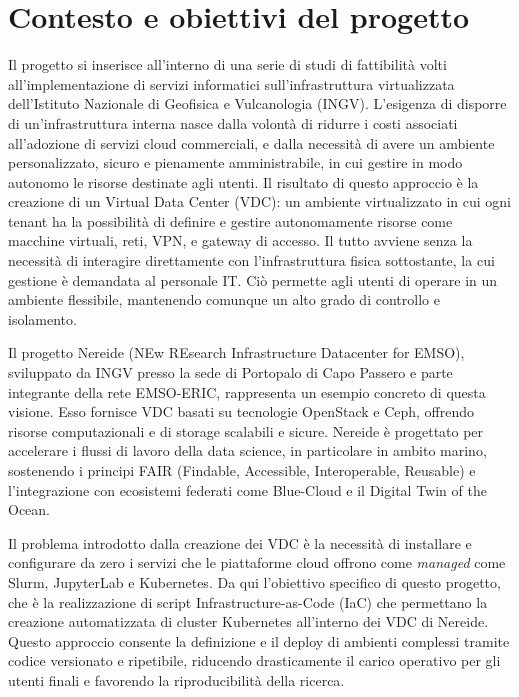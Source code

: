 \documentclass[12pt,a4paper,openright,twoside]{book}
\begin{document}
\section{Contesto e obiettivi del progetto}
Il progetto si inserisce all'interno di una serie di studi di fattibilità volti all'implementazione di servizi informatici sull'infrastruttura virtualizzata dell'Istituto Nazionale di Geofisica e Vulcanologia (INGV).
L'esigenza di disporre di un'infrastruttura interna nasce dalla volontà di ridurre i costi associati all'adozione di servizi cloud commerciali, e dalla necessità di avere un ambiente personalizzato, sicuro e pienamente amministrabile,
in cui gestire in modo autonomo le risorse destinate agli utenti.
Il risultato di questo approccio è la creazione di un Virtual Data Center (VDC): un ambiente virtualizzato in cui ogni tenant ha la possibilità di definire e gestire autonomamente risorse come macchine virtuali, reti, VPN, e gateway di accesso.
Il tutto avviene senza la necessità di interagire direttamente con l'infrastruttura fisica sottostante, la cui gestione è demandata al personale IT.
Ciò permette agli utenti di operare in un ambiente flessibile, mantenendo comunque un alto grado di controllo e isolamento.

Il progetto Nereide (NEw REsearch Infrastructure Datacenter for EMSO), sviluppato da INGV presso la sede di Portopalo di Capo Passero e parte integrante della rete EMSO-ERIC, rappresenta un esempio concreto di questa visione.
Esso fornisce VDC basati su tecnologie OpenStack e Ceph, offrendo risorse computazionali e di storage scalabili e sicure.
Nereide è progettato per accelerare i flussi di lavoro della data science, in particolare in ambito marino, sostenendo i principi FAIR (Findable, Accessible, Interoperable, Reusable) e l'integrazione con ecosistemi federati come Blue-Cloud e il Digital Twin of the Ocean\cite{cacciaguerra2024vdc}.

Il problema introdotto dalla creazione dei VDC è la necessità di installare e configurare da zero i servizi che le piattaforme cloud offrono come \textit{managed} come Slurm, JupyterLab e Kubernetes. 
Da qui l'obiettivo specifico di questo progetto, che è la realizzazione di script Infrastructure-as-Code (IaC) che permettano la creazione automatizzata di cluster Kubernetes all'interno dei VDC di Nereide.
Questo approccio consente la definizione e il deploy di ambienti complessi tramite codice versionato e ripetibile, riducendo drasticamente il carico operativo per gli utenti finali e favorendo la riproducibilità della ricerca.
\end{document}
